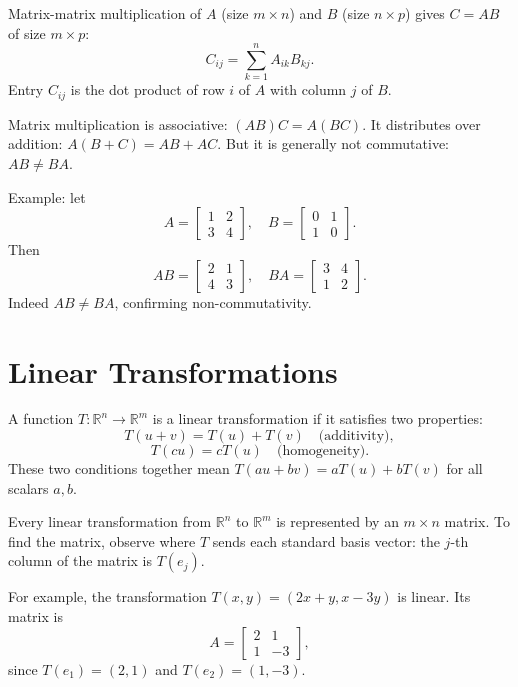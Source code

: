 \documentclass[11pt]{article}
\begin{document}
Matrix-matrix multiplication of $A$ (size $m \times n$) and $B$ (size $n \times p$) gives $C = AB$ of size $m \times p$:
\[
C_{ij} = \sum_{k=1}^n A_{ik} B_{kj}.
\]
Entry $C_{ij}$ is the dot product of row $i$ of $A$ with column $j$ of $B$.

Matrix multiplication is associative: $(AB)C = A(BC)$. It distributes over addition: $A(B + C) = AB + AC$. But it is generally not commutative: $AB \neq BA$.

Example: let
\[
A = \begin{bmatrix} 1 & 2 \\ 3 & 4 \end{bmatrix}, \quad B = \begin{bmatrix} 0 & 1 \\ 1 & 0 \end{bmatrix}.
\]
Then
\[
AB = \begin{bmatrix} 2 & 1 \\ 4 & 3 \end{bmatrix}, \quad BA = \begin{bmatrix} 3 & 4 \\ 1 & 2 \end{bmatrix}.
\]
Indeed $AB \neq BA$, confirming non-commutativity.

\section*{Linear Transformations}

A function $T: \mathbb{R}^n \to \mathbb{R}^m$ is a linear transformation if it satisfies two properties:
\[
T(u + v) = T(u) + T(v) \quad \text{(additivity)},
\]
\[
T(cu) = c T(u) \quad \text{(homogeneity)}.
\]
These two conditions together mean $T(au + bv) = aT(u) + bT(v)$ for all scalars $a, b$.

Every linear transformation from $\mathbb{R}^n$ to $\mathbb{R}^m$ is represented by an $m \times n$ matrix. To find the matrix, observe where $T$ sends each standard basis vector: the $j$-th column of the matrix is $T(e_j)$.

For example, the transformation $T(x,y) = (2x + y, x - 3y)$ is linear. Its matrix is
\[
A = \begin{bmatrix} 2 & 1 \\ 1 & -3 \end{bmatrix},
\]
since $T(e_1) = (2,1)$ and $T(e_2) = (1,-3)$.
\end{document}
